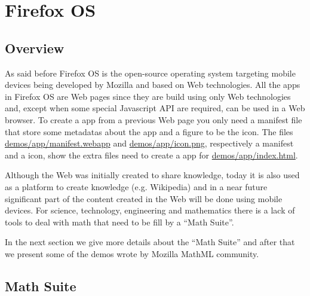 \section{Firefox OS}

\subsection{Overview}

As said before
Firefox OS is the open-source operating system targeting mobile devices being
developed by Mozilla and based on Web technologies. All the apps in Firefox OS
are Web pages since they are build using only Web technologies and, except when
some special Javascript API are required, can be used in a Web browser.
To create a app from a previous Web page you only need a manifest
file that store some metadatas about the app and a figure to be the icon. The
files
\href{http://fred-wang.github.io/MathUI2014/demos/app/manifest.webapp}{demos/app/manifest.webapp}
and
\href{http://fred-wang.github.io/MathUI2014/demos/app/icon.png}{demos/app/icon.png},
respectively a manifest and a icon,
show the extra files need to create a app for
\href{http://fred-wang.github.io/MathUI2014/demos/app/index.html}{demos/app/index.html}.

Although the Web was initially created to share knowledge, today it is also used
as a platform to create knowledge (e.g. Wikipedia) and in a near future
significant part of the content created in the Web will be done using mobile
devices. For science, technology, engineering and mathematics there is a lack of
tools to deal with math that need to be fill by a ``Math Suite''.

In the next section we give more details about the ``Math Suite'' and
after that we present some of the demos wrote by Mozilla MathML community.

\subsection{Math Suite}

